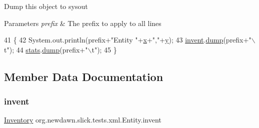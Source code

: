 Dump this object to sysout


\begin{DoxyParams}{Parameters}
{\em prefix} & The prefix to apply to all lines \\
\hline
\end{DoxyParams}

\begin{DoxyCode}
41                                     \{
42         System.out.println(prefix+\textcolor{stringliteral}{"Entity "}+\mbox{\hyperlink{classorg_1_1newdawn_1_1slick_1_1tests_1_1xml_1_1_entity_af0aa8c1d6dc8e8f31cf9fffca28bfd00}{x}}+\textcolor{stringliteral}{","}+\mbox{\hyperlink{classorg_1_1newdawn_1_1slick_1_1tests_1_1xml_1_1_entity_ac9fd9cf691a90fd470ccfde9be5a3d19}{y}});
43         \mbox{\hyperlink{classorg_1_1newdawn_1_1slick_1_1tests_1_1xml_1_1_entity_acd01fa984ba073425ec57b2c071c397f}{invent}}.\mbox{\hyperlink{classorg_1_1newdawn_1_1slick_1_1tests_1_1xml_1_1_inventory_ae6476f32141f6791d3b69cc9687fae4a}{dump}}(prefix+\textcolor{stringliteral}{"\(\backslash\)t"});
44         \mbox{\hyperlink{classorg_1_1newdawn_1_1slick_1_1tests_1_1xml_1_1_entity_ab3afbe872882f8df21ceaea027b85ffb}{stats}}.\mbox{\hyperlink{classorg_1_1newdawn_1_1slick_1_1tests_1_1xml_1_1_stats_ad10fe6ffff96bbf3856ce5789a641683}{dump}}(prefix+\textcolor{stringliteral}{"\(\backslash\)t"});
45     \}
\end{DoxyCode}


\subsection{Member Data Documentation}
\mbox{\label{classorg_1_1newdawn_1_1slick_1_1tests_1_1xml_1_1_entity_acd01fa984ba073425ec57b2c071c397f}} 
\subsubsection{\texorpdfstring{invent}{invent}}
{\footnotesize\ttfamily \mbox{\hyperlink{classorg_1_1newdawn_1_1slick_1_1tests_1_1xml_1_1_inventory}{Inventory}} org.\+newdawn.\+slick.\+tests.\+xml.\+Entity.\+invent\hspace{0.3cm}{\ttfamily [private]}}


